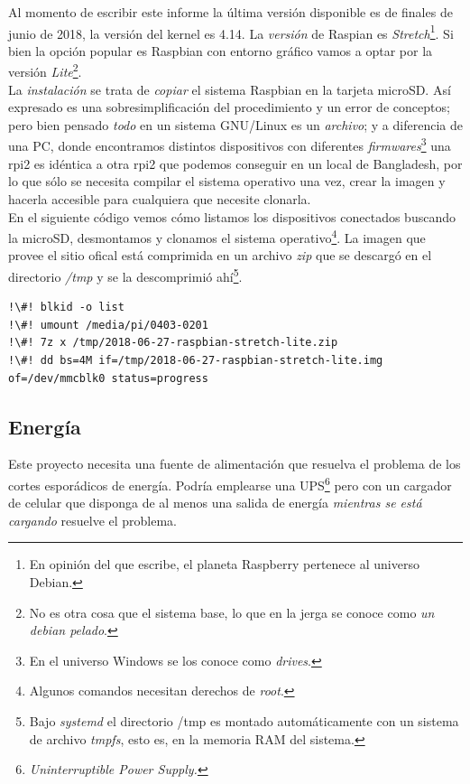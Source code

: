 \documentclass[10pt,a4paper]{article}
\begin{document}
Al momento de escribir este informe la \'ultima versi\'on disponible es de finales de junio de 2018, la versi\'on del kernel es 4.14. La \emph{versi\'on} de Raspian es \emph{Stretch}\footnote{En opini\'on del que escribe, el planeta Raspberry pertenece al universo Debian.}. Si bien la opci\'on popular es Raspbian con entorno gr\'afico vamos a optar por la versi\'on \emph{Lite}\footnote{No es otra cosa que el sistema base, lo que en la jerga se conoce como \emph{un debian pelado}.}.\\

La \emph{instalaci\'on} se trata de \emph{copiar} el sistema Raspbian en la tarjeta microSD. As\'i expresado es una sobresimplificaci\'on del procedimiento y un error de conceptos; pero bien pensado \emph{todo} en un sistema GNU/Linux es un \emph{archivo}; y a diferencia de una PC, donde encontramos distintos dispositivos con diferentes \emph{firmwares}\footnote{En el universo Windows se los conoce como \emph{drives}.} una rpi2 es id\'entica a otra rpi2 que podemos conseguir en un local de Bangladesh, por lo que s\'olo se necesita compilar el sistema operativo una vez, crear la imagen y hacerla accesible para cualquiera que necesite clonarla.\\

En el siguiente c\'odigo vemos c\'omo listamos los dispositivos conectados buscando la microSD, desmontamos y clonamos el sistema operativo\footnote{Algunos comandos necesitan derechos de \emph{root}.}. La imagen que provee el sitio ofical est\'a comprimida en un archivo \emph{zip} que se descarg\'o en el directorio \emph{/tmp} y se la descomprimi\'o ah\'i\footnote{Bajo \emph{systemd} el directorio /tmp es montado autom\'aticamente con un sistema de archivo \emph{tmpfs}, esto es, en la memoria RAM del sistema.}.\\

\begin{lstlisting}
!\#! blkid -o list
!\#! umount /media/pi/0403-0201
!\#! 7z x /tmp/2018-06-27-raspbian-stretch-lite.zip
!\#! dd bs=4M if=/tmp/2018-06-27-raspbian-stretch-lite.img of=/dev/mmcblk0 status=progress
\end{lstlisting}

\subsection{Energ\'ia}

Este proyecto necesita una fuente de alimentaci\'on que resuelva el problema de los cortes espor\'adicos de energ\'ia. Podr\'ia emplearse una UPS\footnote{\emph{Uninterruptible Power Supply.}} pero con un cargador de celular que disponga de al menos una salida de energ\'ia \emph{mientras se est\'a cargando} resuelve el problema.\\
\end{document}
